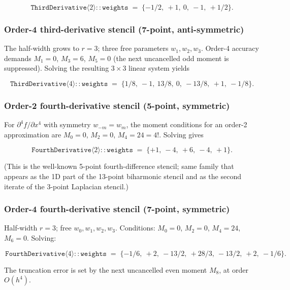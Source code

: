 \[
\boxed{\,\mathtt{ThirdDerivative}\langle 2\rangle\mathtt{::weights} \;=\; \{-1/2,\ +1,\ 0,\ -1,\ +1/2\}.\,}
\]

\subsubsection{Order-4 third-derivative stencil (7-point,
anti-symmetric)}\label{order-4-third-derivative-stencil-7-point-anti-symmetric}

The half-width grows to \(r = 3\); three free parameters
\(w_1, w_2, w_3\). Order-4 accuracy demands \(M_1 = 0\), \(M_3 = 6\),
\(M_5 = 0\) (the next uncancelled odd moment is suppressed). Solving the
resulting \(3 \times 3\) linear system yields

\[
\boxed{\,\mathtt{ThirdDerivative}\langle 4\rangle\mathtt{::weights} \;=\; \{1/8,\ -1,\ 13/8,\ 0,\ -13/8,\ +1,\ -1/8\}.\,}
\]

\subsubsection{Order-2 fourth-derivative stencil (5-point,
symmetric)}\label{order-2-fourth-derivative-stencil-5-point-symmetric}

For \(\partial^4 f/\partial x^4\) with symmetry \(w_{-m} = w_m\), the
moment conditions for an order-2 approximation are \(M_0 = 0\),
\(M_2 = 0\), \(M_4 = 24 = 4!\). Solving gives

\[
\boxed{\,\mathtt{FourthDerivative}\langle 2\rangle\mathtt{::weights} \;=\; \{+1,\ -4,\ +6,\ -4,\ +1\}.\,}
\]

(This is the well-known 5-point fourth-difference stencil; same family
that appears as the 1D part of the 13-point biharmonic stencil and as
the second iterate of the 3-point Laplacian stencil.)

\subsubsection{Order-4 fourth-derivative stencil (7-point,
symmetric)}\label{order-4-fourth-derivative-stencil-7-point-symmetric}

Half-width \(r = 3\); free \(w_0, w_1, w_2, w_3\). Conditions:
\(M_0 = 0\), \(M_2 = 0\), \(M_4 = 24\), \(M_6 = 0\). Solving:

\[
\boxed{\,\mathtt{FourthDerivative}\langle 4\rangle\mathtt{::weights} \;=\; \{-1/6,\ +2,\ -13/2,\ +28/3,\ -13/2,\ +2,\ -1/6\}.\,}
\]

The truncation error is set by the next uncancelled even moment \(M_8\),
at order \(O(h^4)\).

